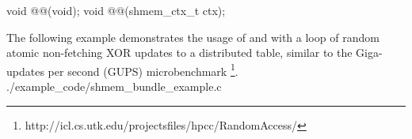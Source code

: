 
\begin{apidefinition}

\begin{Csynopsis}
void @@(void);
void @@(shmem_ctx_t ctx);
\end{Csynopsis}

\begin{apiarguments}
\end{apiarguments}



\begin{apiexamples}

\apicexample
    {The following example demonstrates the usage of
     and  with a loop of
    random atomic non-fetching XOR updates to a distributed table, similar to
    the Giga-updates per second (GUPS) microbenchmark
    \footnote{http://icl.cs.utk.edu/projectsfiles/hpcc/RandomAccess/}.}
    {./example_code/shmem_bundle_example.c}
    {}
\end{apiexamples}

\end{apidefinition}


